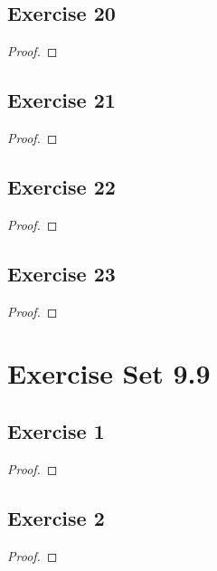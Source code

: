 \documentclass[14pt]{extarticle}
\begin{document}
\subsection{Exercise 20}

\begin{proof}

\end{proof}

\subsection{Exercise 21}

\begin{proof}

\end{proof}

\subsection{Exercise 22}

\begin{proof}

\end{proof}

\subsection{Exercise 23}

\begin{proof}

\end{proof}

\section{Exercise Set 9.9}

\subsection{Exercise 1}

\begin{proof}

\end{proof}

\subsection{Exercise 2}

\begin{proof}

\end{proof}
\end{document}
